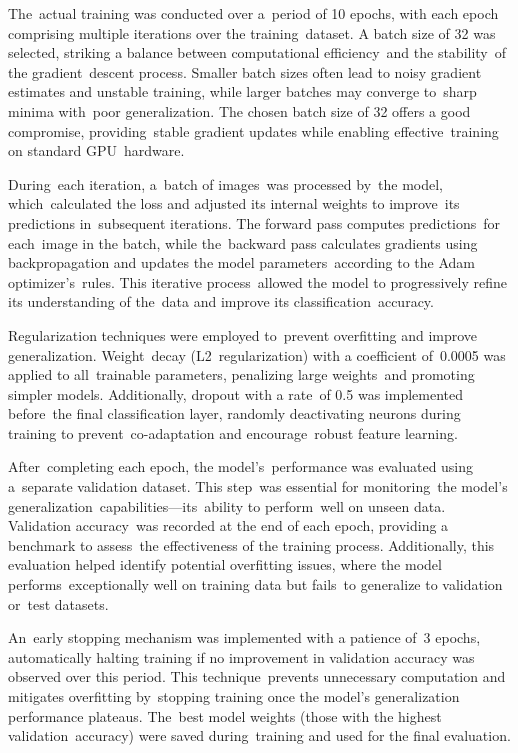 \documentclass[
  twocolumn,
  10pt,
  a4paper,
  journal
]{IEEEtran}
\begin{document}
The~actual training was conducted over a~period of 10 epochs, with each
epoch comprising multiple iterations over the training~dataset. A batch
size of 32 was selected, striking a balance between computational
efficiency~and the stability~of the gradient~descent process. Smaller
batch sizes often lead to noisy gradient estimates and unstable
training, while larger batches may converge to~sharp minima with~poor
generalization. The chosen batch size of 32 offers a good compromise,
providing~stable gradient updates while enabling effective~training on
standard GPU~hardware.

During~each iteration, a~batch of images~was processed by~the model,
which~calculated the loss and adjusted its internal weights to
improve~its predictions in~subsequent iterations. The forward pass
computes predictions~for each~image in the batch, while the~backward
pass calculates gradients using backpropagation and updates the model
parameters~according to the Adam optimizer's~rules. This
iterative process~allowed the model to progressively refine its
understanding of the~data and improve its classification~accuracy.

Regularization techniques were employed to~prevent overfitting and
improve generalization. Weight~decay (L2~regularization) with a
coefficient of~0.0005 was applied to all~trainable parameters,
penalizing large weights~and promoting simpler models. Additionally,
dropout with a rate~of 0.5 was implemented before~the final
classification layer, randomly deactivating neurons during training to
prevent~co-adaptation and encourage~robust feature learning.

After~completing each epoch, the model's~performance was
evaluated using a~separate validation dataset. This step~was essential
for monitoring~the model's
generalization~capabilities---its~ability to perform~well on unseen
data. Validation accuracy~was recorded at the end of each epoch,
providing a benchmark to assess~the effectiveness of the training
process. Additionally, this evaluation helped identify potential
overfitting issues, where the model performs~exceptionally well on
training data but fails~to generalize to validation or~test datasets.

An~early stopping mechanism was implemented with a patience of~3 epochs,
automatically halting training if no improvement in validation accuracy
was observed over this period. This technique~prevents unnecessary
computation and mitigates overfitting by~stopping training once the
model's generalization performance plateaus. The~best
model weights (those with the highest validation~accuracy) were saved
during~training and used for the final evaluation.
\end{document}
